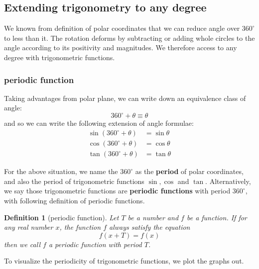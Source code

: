 \documentclass[12pt]{article}
\newtheorem{definition}{Definition}[section]
\begin{document}
    \subsection{Extending trigonometry to any degree}

    We known from definition of polar coordinates that we can reduce angle over $360^\circ$ to less than it. The rotation deforms by subtracting or adding whole circles to the angle according to its positivity and magnitudes. We therefore access to any degree with trigonometric functions.

    \subsubsection*{periodic function}

    Taking advantages from polar plane, we can write down an equivalence class of angle: \[360^\circ + \theta \equiv \theta\] and so we can write the following extension of angle formulae:\begin{align*}
        \sin{(360^\circ + \theta)}&=\sin{\theta}\\
        \cos{(360^\circ + \theta)}&=\cos{\theta}\\
        \tan{(360^\circ + \theta)}&=\tan{\theta}
    \end{align*}

    For the above situation, we name the $360^\circ$ as the \textbf{period} of polar coordinates, and also the period of trigonometric functions $\sin, \cos$ and $\tan$. Alternatively, we say those trigonometric functions are \textbf{periodic functions} with period $360^\circ$, with following definition of periodic functions.
    
    \begin{definition}[periodic function]
        Let $T$ be a number and $f$ be a function. If for any real number $x$, the function $f$ always satisfy the equation \[f(x+T)=f(x)\] then we call $f$ a periodic function with period $T$.
    \end{definition}

    To visualize the periodicity of trigonometric functions, we plot the graphs out.
\end{document}
